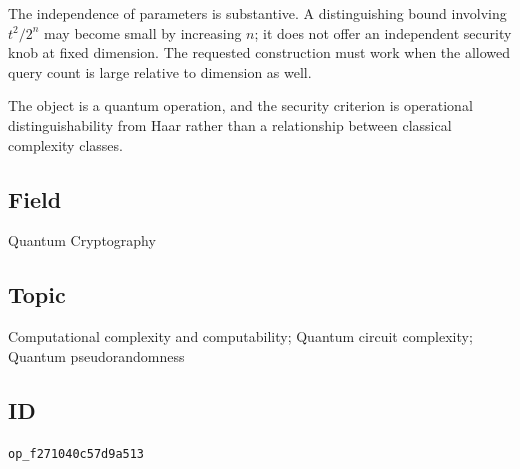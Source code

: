 The independence of parameters is substantive. A distinguishing bound involving $t^2/2^n$ may become small by increasing $n$; it does not offer an independent security knob at fixed dimension. The requested construction must work when the allowed query count is large relative to dimension as well.

The object is a quantum operation, and the security criterion is operational distinguishability from Haar rather than a relationship between classical complexity classes.

\subsection*{Field}

Quantum Cryptography

\subsection*{Topic}

Computational complexity and computability; Quantum circuit complexity; Quantum pseudorandomness

\subsection*{ID}

\texttt{op\_f271040c57d9a513}
